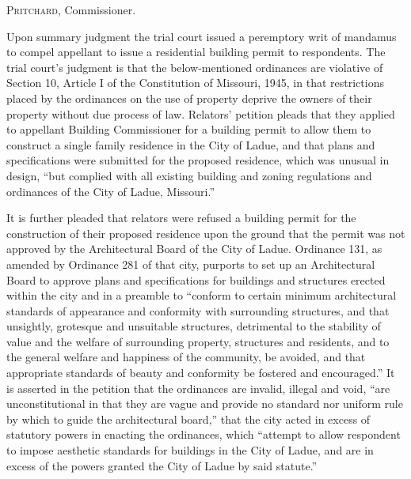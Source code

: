 

\opinion \textsc{Pritchard}, Commissioner.

Upon summary judgment the trial court issued a peremptory writ of mandamus to
compel appellant to issue a residential building permit to respondents. The
trial court's judgment is that the below-mentioned ordinances are violative of
Section 10, Article I of the Constitution of Missouri, 1945, in that
restrictions placed by the ordinances on the use of property deprive the owners
of their property without due process of law. Relators' petition pleads that
they applied to appellant Building Commissioner for a building permit to allow
them to construct a single family residence in the City of Ladue, and that plans
and specifications were submitted for the proposed residence, which was unusual
in design, ``but complied with all existing building and zoning regulations and
ordinances of the City of Ladue, Missouri.''



It is further pleaded that relators were refused a building permit for the
construction of their proposed residence upon the ground that the permit was not
approved by the Architectural Board of the City of Ladue. Ordinance 131, as
amended by Ordinance 281 of that city, purports to set up an Architectural Board
to approve plans and specifications for buildings and structures erected within
the city and in a preamble to ``conform to certain minimum architectural
standards of appearance and conformity with surrounding structures, and that
unsightly, grotesque and unsuitable structures, detrimental to the stability of
value and the welfare of surrounding property, structures and residents, and to
the general welfare and happiness of the community, be avoided, and that
appropriate standards of beauty and conformity be fostered and encouraged.'' It
is asserted in the petition that the ordinances are invalid, illegal and void,
``are unconstitutional in that they are vague and provide no standard nor
uniform rule by which to guide the architectural board,'' that the city acted in
excess of statutory powers in enacting the ordinances, which ``attempt to allow
respondent to impose aesthetic standards for buildings in the City of Ladue, and
are in excess of the powers granted the City of Ladue by said statute.''

